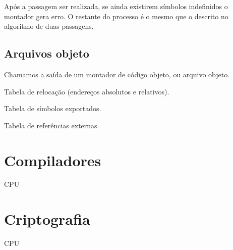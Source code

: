 Após a passagem ser realizada, se ainda existirem símbolos indefinidos o montador gera erro. O restante do processo é o mesmo que o descrito no algoritmo de duas passagens.

\subsection{Arquivos objeto}

Chamamos a saída de um montador de código objeto, ou arquivo objeto.

Tabela de relocação (endereços absolutos e relativos).

Tabela de símbolos exportados.

Tabela de referências externas.

\section{Compiladores}

CPU

\section{Criptografia}

CPU
